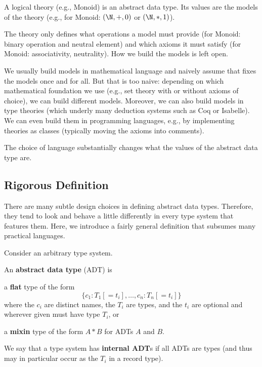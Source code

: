 \begin{example}[Theories]
A logical theory (e.g., Monoid) is an abstract data type.
Its values are the models of the theory (e.g., for Monoid: $(\N,+,0)$ or $(\N,*,1)$).

The theory only defines what operations a model must provide (for Monoid: binary operation and neutral element) and which axioms it must satisfy (for Monoid: associativity, neutrality).
How we build the models is left open.

We usually build models in mathematical language and naively assume that fixes the models once and for all.
But that is too naive: depending on which mathematical foundation we use (e.g., set theory with or without axioms of choice), we can build different models.
Moreover, we can also build models in type theories (which underly many deduction systems such as Coq or Isabelle).
We can even build them in programming languages, e.g., by implementing theories as classes (typically moving the axioms into comments).

The choice of language substantially changes what the values of the abstract data type are.
\end{example}

\subsection{Rigorous Definition}

There are many subtle design choices in defining abstract data types.
Therefore, they tend to look and behave a little differently in every type system that features them.
Here, we introduce a fairly general definition that subsumes many practical languages.

\begin{definition}
Consider an arbitrary type system.

An \textbf{abstract data type} (ADT) is
\begin{compactitem}
\item a \textbf{flat} type of the form
  \[\{c_1:T_1[=t_i],\ldots,c_n:T_n[=t_i]\}\]
  where the $c_i$ are distinct names, the $T_i$ are types, and the $t_i$ are optional and wherever given must have type $T_i$, or
\item a \textbf{mixin} type of the form $A*B$ for ADTs $A$ and $B$.
\end{compactitem}

We say that a type system has \textbf{internal ADT}s if all ADTs are types (and thus may in particular occur as the $T_i$ in a record type).
\end{definition}

